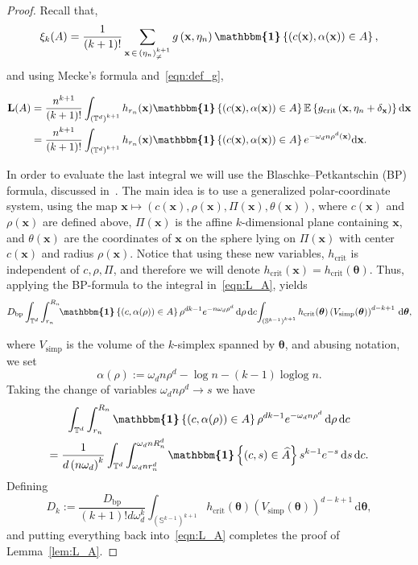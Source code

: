 \documentclass[AHL,Unicode,longabstracts]{cedram}
\DeclareMathOperator{\logg}{\log\log}
\DeclareMathOperator{\simp}{simp}
\newcommand*\bL{\mathbf{L}}
\newcommand{\bx}{\mathbf{x}}
\newcommand*\T{\mathbb{T}}
\newcommand{\E}{\mathbb{E}}
\renewcommand*\S{\mathbb{S}}
\newcommand*\md{\mathrm{d}}
\newcommand{\mean}[1] {\E\left\{{#1}\right\}}
\newcommand{\ind}{\boldsymbol{\mathbbm{1}}}
\newcommand{\set}[1]{\left\{#1\right\}}
\newcommand*\bth{\boldsymbol\theta}
\newcommand*\gcrit{g_{\mathrm{crit}}}
\newcommand*\hcrit{h_{\mathrm{crit}}}
\newcommand*\Abp{{D}_{\mathrm{bp}}}
\newcommand*\vsimp{V_{\simp}}
\let\oldhat\hat
\renewcommand*{\hat}[1]{\mathchoice{\widehat{#1}}{\widehat{#1}}{\oldhat{#1}}{\oldhat{#1}}}
\begin{document}
\begin{proof}
Recall that,
\[
\xi_k(A) = \frac{1}{(k+1)!} \sum_{\bx\,\in\,\left(\eta_n\right)^{k+1}_{\ne}} g\left(\bx,\eta_n\right) \ind\set{\left(c(\bx),\alpha(\bx)\right)\in A},
\]
and using Mecke's formula and~\eqref{eqn:def_g},

\begin{equation}\label{eqn:L_A}
\begin{split}
\bL(A) &= \frac{n^{k+1}}{(k+1)!} \int_{\left(\T^d\right)^{k+1}}h_{r_n}(\bx)\ind\set{\left(c(\bx),\alpha(\bx)\right)\in A}\mean{\gcrit\left(\bx,\eta_n+\delta_{\bx}\right)} \md \bx\\
&= \frac{n^{k+1}}{(k+1)!} \int_{\left(\T^d\right)^{k+1}}h_{r_n}(\bx)\ind\set{\left(c(\bx),\alpha(\bx)\right)\in A}e^{-\omega_dn\rho^d(\bx)} \md \bx.
\end{split}
\end{equation}

In order to evaluate the last integral we will use the Blaschke--Petkantschin (BP) formula, discussed in~\cite[Appendix~C]{Bobrowski2019}. The main idea is to use a generalized polar-coordinate system, using the map $\bx \mapsto (c(\bx), \rho(\bx),\Pi(\bx),\theta(\bx))$, where $c(\bx)$ and $\rho(\bx)$ are defined above, $\Pi(\bx)$ is the affine $k$-dimensional plane containing $\bx$, and $\theta(\bx)$ are the coordinates of $\bx$ on the sphere lying on $\Pi(\bx)$ with center $c(\bx)$ and radius $\rho(\bx)$. Notice that using these new variables, $\hcrit$ is independent of $c,\rho,\Pi$, and therefore we will denote $\hcrit(\bx) = \hcrit(\bth)$. Thus, applying the BP-formula to the integral in~\eqref{eqn:L_A}, yields
\[
\Abp\int_{\T^d}\int_{r_n}^{R_n}\!\!\ind\set{\left(c, \alpha(\rho)\right)\in A}\rho^{dk-1} e^{-n\omega_d\rho^d} \, \md\rho \, \md c\!\int_{\left(\S^{k-1}\right)^{k+1}} \hcrit(\bth)\left(\vsimp(\bth)\right)^{d-k+1} \, \md\bth,
\]

where $\vsimp$ is the volume of the $k$-simplex spanned by $\bth$, and abusing notation, we set
\[
\alpha(\rho) := \omega_d n\rho^d - \log n - (k-1)\logg n.
\]
Taking the change of variables $\omega_d n\rho^d \to s$ we have
\begin{multline*}
\int_{\T^d}\int_{r_n}^{R_n} \ind\set{\left(c, \alpha(\rho)\right)\in A} \rho^{dk-1} e^{-\omega_dn\rho^d} \, \md\rho \, \md c\\
= \frac{1}{d \left(n\omega_d\right)^k}\int_{\T^d}\int_{\omega_d nr_n^d}^{\omega_d nR_n^d} \ind\set{(c, s)\in \hat A}s^{k-1} e^{-s} \, \md s \, \md c.
\end{multline*}
Defining
\[
D_k := \frac{\Abp}{(k+1)!d \omega_d^k}\int_{\left(\S^{k-1}\right)^{k+1}}\hcrit(\bth) \left(\vsimp(\bth)\right)^{d-k+1} \, \md\bth,
\]
and putting everything back into~\eqref{eqn:L_A} completes the proof of Lemma~\ref{lem:L_A}.
\end{proof}
\end{document}
